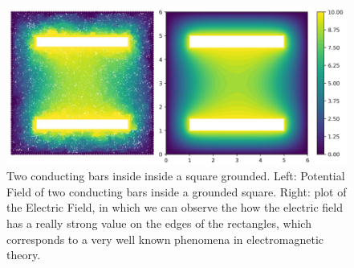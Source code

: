 \documentclass{PoS}
\begin{document}



\begin{figure}
\begin{center}
\includegraphics[width=.95\textwidth]{Figures/FEM/TwoBars_GFD&FEM.png}
\caption{Two conducting bars inside inside a square grounded. Left: Potential Field of two conducting bars inside a grounded square. Right: plot of the Electric Field, in which we can observe the how the electric field has a really strong value on the edges of the rectangles, which corresponds to a very well known phenomena in electromagnetic theory.}
\label{fig:VE_Dolphin}
\end{center}
\end{figure}
\end{document}
